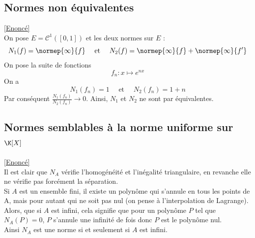 \documentclass{book}
\begin{document}
	\subsection{Normes non équivalentes}\label{sec:normes-non-equivalentes}
		\textcolor{blue}{\hyperref[Normes non équivalentes]{[Enoncé]}}\\
		On pose $E=\mathcal{C}^1([0,1])$ et les deux normes sur $E$ :
		\[N_1(f)=\normep{\infty}{f}\quad \text{ et }\quad N_2(f)=\normep{\infty}{f}+\normep{\infty}{f'}\]
		On pose la suite de fonctions \[f_n:x\mapsto e^{nx}\]
		On a \[N_1(f_n)=1\quad\text{ et }\quad N_2(f_n)=1+n\]
		Par conséquent $\displaystyle \frac{N_1(f_n)}{N_2(f_n)}\rightarrow 0$.
		Ainsi, $N_1$ et $N_2$ ne sont par équivalentes.
		
	\subsection{Normes semblables à la norme uniforme sur $\K[X]$}\label{sec:normes-semblables-a-la-norme-uniforme-sur-kx}
	\textcolor{blue}{\hyperref[Normes semblables à la norme uniforme sur KX]{[Enoncé]}}\\
	Il est clair que $N_A$ vérifie l'homogénéité et l'inégalité triangulaire, en revanche elle ne vérifie pas forcément la séparation.\\
	Si $A$ est un ensemble fini, il existe un polynôme qui s'annule en tous les points de A, mais pour autant qui ne soit pas nul (on pense à l'interpolation de Lagrange).\\
	Alors, que si $A$ est infini, cela signifie que pour un polynôme $P$ tel que $N_A(P)=0$, $P$ s'annule une infinité de fois donc $P$ est le polynôme nul.\\
	Ainsi $N_A$ est une norme si et seulement si $A$ est infini.
		
\end{document}
